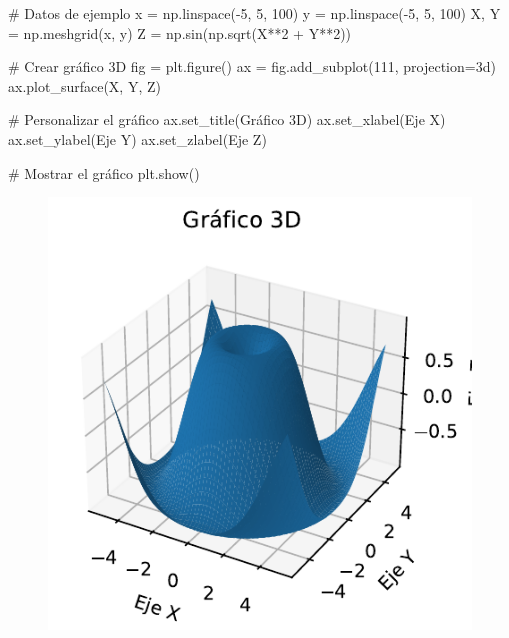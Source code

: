 \documentclass[
  a4paper,
]{article}
\newenvironment{Shaded}{}{}
\newcommand{\CommentTok}[1]{\textcolor[rgb]{0.42,0.45,0.49}{#1}}
\newcommand{\DecValTok}[1]{\textcolor[rgb]{0.00,0.36,0.77}{#1}}
\newcommand{\NormalTok}[1]{\textcolor[rgb]{0.14,0.16,0.18}{#1}}
\newcommand{\OperatorTok}[1]{\textcolor[rgb]{0.14,0.16,0.18}{#1}}
\newcommand{\StringTok}[1]{\textcolor[rgb]{0.01,0.18,0.38}{#1}}
\begin{document}
\begin{Shaded}
\begin{Highlighting}[]
\CommentTok{\# Datos de ejemplo}
\NormalTok{x }\OperatorTok{=}\NormalTok{ np.linspace(}\OperatorTok{{-}}\DecValTok{5}\NormalTok{, }\DecValTok{5}\NormalTok{, }\DecValTok{100}\NormalTok{)}
\NormalTok{y }\OperatorTok{=}\NormalTok{ np.linspace(}\OperatorTok{{-}}\DecValTok{5}\NormalTok{, }\DecValTok{5}\NormalTok{, }\DecValTok{100}\NormalTok{)}
\NormalTok{X, Y }\OperatorTok{=}\NormalTok{ np.meshgrid(x, y)}
\NormalTok{Z }\OperatorTok{=}\NormalTok{ np.sin(np.sqrt(X}\OperatorTok{**}\DecValTok{2} \OperatorTok{+}\NormalTok{ Y}\OperatorTok{**}\DecValTok{2}\NormalTok{))}

\CommentTok{\# Crear gráfico 3D}
\NormalTok{fig }\OperatorTok{=}\NormalTok{ plt.figure()}
\NormalTok{ax }\OperatorTok{=}\NormalTok{ fig.add\_subplot(}\DecValTok{111}\NormalTok{, projection}\OperatorTok{=}\StringTok{\textquotesingle{}3d\textquotesingle{}}\NormalTok{)}
\NormalTok{ax.plot\_surface(X, Y, Z)}

\CommentTok{\# Personalizar el gráfico}
\NormalTok{ax.set\_title(}\StringTok{\textquotesingle{}Gráfico 3D\textquotesingle{}}\NormalTok{)}
\NormalTok{ax.set\_xlabel(}\StringTok{\textquotesingle{}Eje X\textquotesingle{}}\NormalTok{)}
\NormalTok{ax.set\_ylabel(}\StringTok{\textquotesingle{}Eje Y\textquotesingle{}}\NormalTok{)}
\NormalTok{ax.set\_zlabel(}\StringTok{\textquotesingle{}Eje Z\textquotesingle{}}\NormalTok{)}

\CommentTok{\# Mostrar el gráfico}
\NormalTok{plt.show()}
\end{Highlighting}
\end{Shaded}

\begin{figure}[H]

{\centering \includegraphics{index_files/figure-pdf/cell-6-output-1.pdf}

}

\end{figure}
\end{document}
